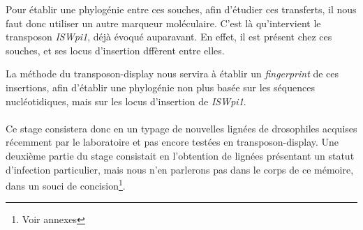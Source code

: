 Pour établir une phylogénie entre ces souches, afin d’étudier ces transferts, il nous faut donc utiliser un autre marqueur moléculaire. C’est là qu’intervient le transposon \textit{ISWpi1}, déjà évoqué auparavant.
En effet, il est présent chez ces souches, et ses locus d’insertion dffèrent entre elles.

La méthode du transposon-display nous servira à établir un \textit{fingerprint} %
de ces insertions, afin d’établir une phylogénie non plus basée sur les séquences nucléotidiques, mais sur les locus d’insertion de \textit{ISWpi1}.

\paragraph{} %
\label{par:Sujet}
Ce stage consistera donc en un typage de nouvelles lignées de drosophiles acquises récemment par le laboratoire et pas encore testées en transposon-display. Une deuxième partie du stage consistait en l’obtention de lignées  présentant un statut d'infection particulier, mais nous n'en parlerons pas dans le corps de ce mémoire, dans un souci de concision\footnote{Voir annexes}.
